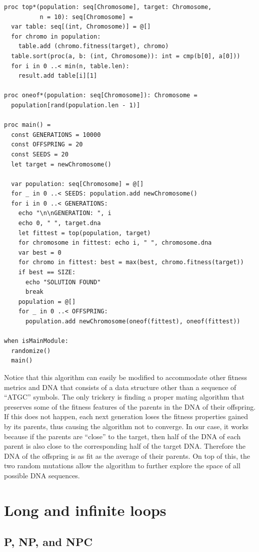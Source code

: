 \documentclass[justified, sixbynine]{tufte-book}
\def\ft{\small\tt}
\theoremstyle{plain}%
\newtheorem * {corollary}{Corollary}
\theoremstyle{definition}
\theoremstyle{remark}
\newtheorem * {remark}{Remark}
\newtheorem * {note}{Note}
\begin{document}
\begin{fullwidth}
\begin{lstlisting}[caption={in file: {\ft genetic.nim}}]
proc top*(population: seq[Chromosome], target: Chromosome,
          n = 10): seq[Chromosome] =
  var table: seq[(int, Chromosome)] = @[]
  for chromo in population:
    table.add (chromo.fitness(target), chromo)
  table.sort(proc(a, b: (int, Chromosome)): int = cmp(b[0], a[0]))
  for i in 0 ..< min(n, table.len):
    result.add table[i][1]

proc oneof*(population: seq[Chromosome]): Chromosome =
  population[rand(population.len - 1)]

proc main() =
  const GENERATIONS = 10000
  const OFFSPRING = 20
  const SEEDS = 20
  let target = newChromosome()

  var population: seq[Chromosome] = @[]
  for _ in 0 ..< SEEDS: population.add newChromosome()
  for i in 0 ..< GENERATIONS:
    echo "\n\nGENERATION: ", i
    echo 0, " ", target.dna
    let fittest = top(population, target)
    for chromosome in fittest: echo i, " ", chromosome.dna
    var best = 0
    for chromo in fittest: best = max(best, chromo.fitness(target))
    if best == SIZE:
      echo "SOLUTION FOUND"
      break
    population = @[]
    for _ in 0 ..< OFFSPRING:
      population.add newChromosome(oneof(fittest), oneof(fittest))

when isMainModule:
  randomize()
  main()
\end{lstlisting}

Notice that this algorithm can easily be modified to accommodate other fitness metrics and DNA that consists of a data structure other than a sequence of ``ATGC'' symbols. The only trickery is finding a proper mating algorithm that preserves some of the fitness features of the parents in the DNA of their offspring. If this does not happen, each next generation loses the fitness properties gained by its parents, thus causing the algorithm not to converge. In our case, it works because if the parents are ``close'' to the target, then half of the DNA of each parent is also close to the corresponding half of the target DNA. Therefore the DNA of the offspring is as fit as the average of their parents. On top of this, the two random mutations allow the algorithm to further explore the space of all possible DNA sequences.

\goodbreak\section{Long and infinite loops}
\goodbreak\subsection{P, NP, and NPC}


\end{fullwidth}
\end{document}
